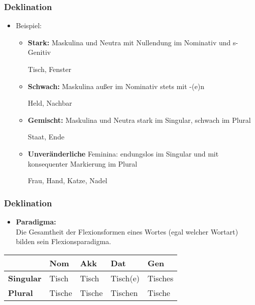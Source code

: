 
\begin{frame}
\frametitle{Deklination}

\begin{itemize}
	\item Beispiel:
	
	\begin{itemize}
		\item \textbf{Stark:} Maskulina und Neutra mit Nullendung im Nominativ und s-Genitiv
		
		\ea Tisch, Fenster
		\z
		
		\item \textbf{Schwach:} Maskulina au\ss{}er im Nominativ stets mit -(e)n
		
		\ea Held, Nachbar
		\z
		
		\item \textbf{Gemischt:} Maskulina und Neutra stark im Singular, schwach im Plural
		
		\ea Staat, Ende
		\z
		
		\item \textbf{Unveränderliche} Feminina: endungslos im Singular und mit konsequenter Markierung im Plural
		
		\ea Frau, Hand, Katze, Nadel
		\z
		
	\end{itemize}
\end{itemize}


\end{frame}




\begin{frame}
\frametitle{Deklination}

\begin{itemize}
	\item \textbf{Paradigma:}\\
	Die Gesamtheit der Flexionsformen eines Wortes (egal welcher Wortart) bilden sein Flexionsparadigma.
\end{itemize}

\begin{table}
\centering

\begin{tabular}{p{1.8cm}|p{1.8cm}|p{1.8cm}|p{1.8cm}|p{1.8cm}}
& \textbf{Nom} & \textbf{Akk} & \textbf{Dat} & \textbf{Gen}\\
\hline
\textbf{Singular} & Tisch & Tisch & Tisch(e) & Tisches\\
\hline
\textbf{Plural} & Tische & Tische & Tischen & Tische\\

\end{tabular}

\end{table}

\end{frame}




